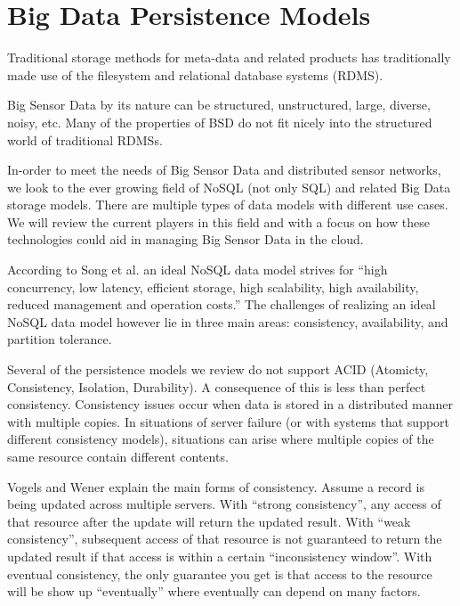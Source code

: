 \documentclass[twocolumn]{article}
\begin{document}
\section{Big Data Persistence Models}
Traditional storage methods for meta-data and related products has traditionally made use of the filesystem and relational database systems (RDMS).

Big Sensor Data by its nature can be structured, unstructured, large, diverse, noisy, etc. Many of the properties of BSD do not fit nicely into the structured world of traditional RDMSs.

In-order to meet the needs of Big Sensor Data and distributed sensor networks, we look to the ever growing field of NoSQL (not only SQL) and related Big Data storage models. There are multiple types of data models with different use cases. We will review the current players in this field and with a focus on how these technologies could aid in managing Big Sensor Data in the cloud.

According to Song et al.\cite{5980904} an ideal NoSQL data model strives for ``high concurrency, low latency, efficient storage, high scalability, high availability, reduced management and operation costs.'' The challenges of realizing an ideal NoSQL data model however lie in three main areas\cite{chen_big_2014}: consistency, availability, and partition tolerance. 

Several of the persistence models we review do not support ACID (Atomicty, Consistency, Isolation, Durability). A consequence of this is less than perfect consistency. Consistency issues occur when data is stored in a distributed manner with multiple copies. In situations of server failure (or with systems that support different consistency models), situations can arise where multiple copies of the same resource contain different contents. 

Vogels and Wener\cite{vogels_eventually_2008} explain the main forms of consistency. Assume a record is being updated across multiple servers. With ``strong consistency'', any access of that resource after the update will return the updated result. With ``weak consistency'', subsequent access of that resource is not guaranteed to return the updated result if that access is within a certain ``inconsistency window''. With eventual consistency, the only guarantee you get is that access to the resource will be show up ``eventually'' where eventually can depend on many factors.
\end{document}
